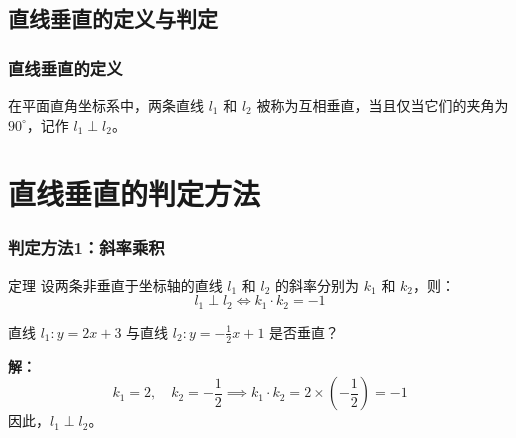   \subsection{直线垂直的定义与判定}
\begin{frame}
    \frametitle{直线垂直的定义}
    \begin{block}{}
        在平面直角坐标系中，两条直线 \( l_1 \) 和 \( l_2 \) 被称为互相垂直，当且仅当它们的夹角为 \( 90^\circ \)，记作 \( l_1 \perp l_2 \)。
    \end{block}

    \begin{center}
    \end{center}
\end{frame}



\section{直线垂直的判定方法}
\begin{frame}
    \frametitle{判定方法1：斜率乘积}
    \begin{block}{定理}
        设两条非垂直于坐标轴的直线 \( l_1 \) 和 \( l_2 \) 的斜率分别为 \( k_1 \) 和 \( k_2 \)，则：
        \[
        l_1 \perp l_2 \iff k_1 \cdot k_2 = -1
        \]
    \end{block}

    \begin{example}
        直线 \( l_1: y = 2x + 3 \) 与直线 \( l_2: y = -\frac{1}{2}x + 1 \) 是否垂直？

        \textbf{解：}
        \[
        k_1 = 2, \quad k_2 = -\frac{1}{2} \implies k_1 \cdot k_2 = 2 \times \left(-\frac{1}{2}\right) = -1
        \]
        因此，\( l_1 \perp l_2 \)。
    \end{example}
\end{frame}

